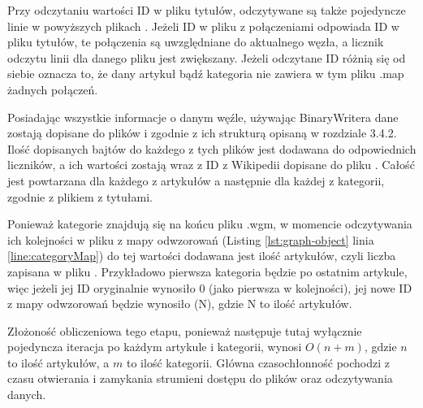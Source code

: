 Przy odczytaniu wartości ID w pliku tytułów, odczytywane są także pojedyncze linie w powyższych plikach . Jeżeli ID w pliku z połączeniami odpowiada ID w pliku tytułów, te połączenia są uwzględniane do aktualnego węzła, a licznik odczytu linii dla danego pliku jest zwiększany. Jeżeli odczytane ID różnią się od siebie oznacza to, że dany artykuł bądź kategoria nie zawiera w tym pliku .map żadnych połączeń.

Posiadając wszystkie informacje o danym węźle, używając BinaryWritera dane zostają dopisane do plików  i  zgodnie z ich strukturą opisaną w rozdziale 3.4.2. Ilość dopisanych bajtów do każdego z tych plików jest dodawana do odpowiednich liczników, a ich wartości zostają wraz z ID z Wikipedii dopisane do pliku . Całość jest powtarzana dla każdego z artykułów a następnie dla każdej z kategorii, zgodnie z plikiem z tytułami.

Ponieważ kategorie znajdują się na końcu pliku .wgm, w momencie odczytywania ich kolejności w pliku  z mapy odwzorowań (Listing \ref{lst:graph-object} linia \ref{line:categoryMap}) do tej wartości dodawana jest ilość artykułów, czyli liczba zapisana w pliku . Przykładowo pierwsza kategoria będzie po ostatnim artykule, więc jeżeli jej ID oryginalnie wynosiło 0 (jako pierwsza w kolejności), jej nowe ID z mapy odwzorowań będzie wynosiło (N), gdzie N to ilość artykułów.

Złożoność obliczeniowa tego etapu, ponieważ następuje tutaj wyłącznie pojedyncza iteracja po każdym artykule i kategorii, wynosi $O(n+m)$, gdzie $n$ to ilość artykułów, a $m$ to ilość kategorii. Główna czasochłonność pochodzi z czasu otwierania i zamykania strumieni dostępu do plików oraz odczytywania danych.
